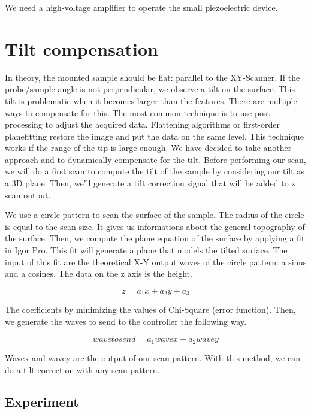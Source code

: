 We need a high-voltage amplifier to operate the small piezoelectric device. 

\section{Tilt compensation}

In theory, the mounted sample should be flat: parallel to the XY-Scanner. If the probe/sample angle is not perpendicular, we observe a tilt on the surface. This tilt is problematic when it becomes larger than the features. There are multiple ways to compensate for this. The most common technique is to use post processing to adjust the acquired data. Flattening algorithms or first-order planefitting restore the image and put the data on the same level. This technique works if the range of the tip is large enough. We have decided to take another approach and to dynamically compensate for the tilt. Before performing our scan, we will do a first scan to compute the tilt of the sample by considering our tilt as a 3D plane. Then, we'll generate a tilt correction signal that will be added to z scan output.

We use a circle pattern to scan the surface of the sample. The radius of the circle is equal to the scan size. It gives us informations about the general topography of the surface. Then, we compute the plane equation of the surface by applying a fit in Igor Pro. This fit will generate a plane that models the tilted surface. The input of this fit are the theoretical X-Y output waves of the circle pattern: a sinus and a cosines. The data on the z axis is the height.

\begin{equation}\label{eqn:planeeq}
z = a_1 x + a_2 y + a_3 
\end{equation}

The coefficients by minimizing the values of Chi-Square (error function). Then, we generate the waves to send to the controller the following way.

\begin{equation}\label{eqn:sendwave}
wavetosend = a_1 wavex + a_2 wavey 
\end{equation}

Wavex and wavey are the output of our scan pattern. With this method, we can do a tilt correction with any scan pattern.


\subsection{Experiment}

